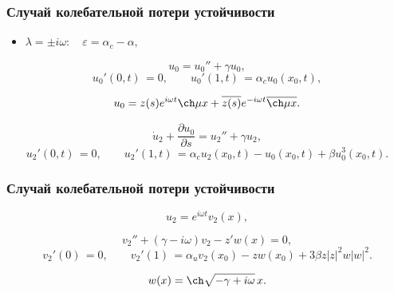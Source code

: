 \documentclass[fullscreen=true, unicode, bookmarks=false]{beamer}
\begin{document}
\begin{frame}
\frametitle{ Случай колебательной потери устойчивости }

\begin{itemize}
\item { $ \lambda = \pm i \omega: \quad \varepsilon=\alpha_c-\alpha, $
}
\end{itemize}

\medskip
\pause

\begin{equation}
	u_0 = u_0'' + \gamma u_0,
\end{equation}
\begin{equation}
	u_0'(0, t) \, = 0, \qquad u_0'(1, t) \, = \alpha_c u_0(x_0, t),
\end{equation}

$$ u_0 = z(s) e^{i \omega t} \ch \mu x + \overline{z(s)} e^{-i \omega t} \overline{\ch \mu x}. $$

\medskip

\begin{equation}
	\dot u_2 + \frac{\partial u_0}{\partial s} = u_2'' + \gamma u_2,
\end{equation}
\begin{equation}
	u_2'(0, t) \, = 0, \qquad u_2'(1, t) \, = \alpha_c u_2(x_0, t) - u_0(x_0, t) + \beta u_0^3(x_0, t).
\end{equation}

\end{frame}

\begin{frame}
\frametitle{ Случай колебательной потери устойчивости }

$$ u_2 = e^{i \omega t} v_2(x), $$

\bigskip
\pause

\begin{equation}
	v_2'' + (\gamma - i \omega) v_2 - z' w(x) = 0,
\end{equation}
\begin{equation}
	v_2'(0) \, = 0, \qquad v_2'(1) \, = \alpha_u v_2(x_0) - z w(x_0) + 3\beta z|z|^2 w|w|^2.
\end{equation}

$$ w(x) = \ch \sqrt{-\gamma + i \omega} \, x. $$

\end{frame}
\end{document}
